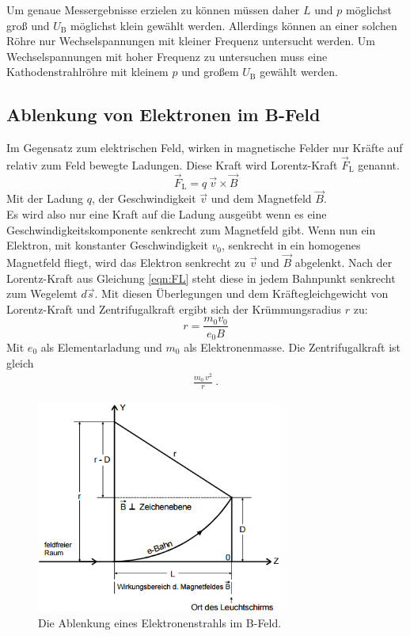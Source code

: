 Um genaue Messergebnisse erzielen zu können müssen daher $L$ und $p$ möglichst groß und $U_\text{B}$ möglichst klein gewählt werden. Allerdings können an einer solchen Röhre nur Wechselspannungen mit kleiner Frequenz untersucht werden. Um Wechselspannungen mit hoher Frequenz zu untersuchen muss eine Kathodenstrahlröhre mit kleinem $p$ und großem $U_\text{B}$ gewählt werden.

\subsection{Ablenkung von Elektronen im B-Feld}
Im Gegensatz zum elektrischen Feld, wirken in magnetische Felder nur Kräfte auf relativ zum Feld bewegte Ladungen. Diese Kraft wird Lorentz-Kraft $\vec{F}_\text{L}$ genannt.
\begin{equation}
	\vec{F}_\text{L} = q \ \vec{v} \times \vec{B}
	\label{eqn:FL}
\end{equation}
Mit der Ladung $q$, der Geschwindigkeit $\vec{v}$ und dem Magnetfeld $\vec{B}$.\\
Es wird also nur eine Kraft auf die Ladung ausgeübt wenn es eine Geschwindigkeitskomponente senkrecht zum Magnetfeld gibt. Wenn nun ein Elektron, mit konstanter Geschwindigkeit $v_0$, senkrecht in ein homogenes Magnetfeld fliegt, wird das Elektron senkrecht zu $\vec{v}$ und $\vec{B}$ abgelenkt. Nach der Lorentz-Kraft aus Gleichung \eqref{eqn:FL} steht diese in jedem Bahnpunkt senkrecht zum Wegelemt $d \vec{s}$. Mit diesen Überlegungen und dem Kräftegleichgewicht von Lorentz-Kraft und Zentrifugalkraft ergibt sich der Krümmungsradius $r$ zu:
\begin{equation}
	r = \frac{m_0 v_0}{e_0 B}
	\label{eqn:r}
\end{equation}
Mit $e_0$ als Elementarladung und $m_0$ als Elektronenmasse. Die Zentrifugalkraft ist gleich
\begin{align*}
	\frac{m_0\, v^2}{r} \ .
\end{align*}

\begin{figure}[H]
	\centering
	\includegraphics[height=7cm]{picture/AblenkungBFeld}
	\caption{Die Ablenkung eines Elektronenstrahls im B-Feld. \cite[2]{V502}}
	\label{fig:AblenkungB}
\end{figure}

